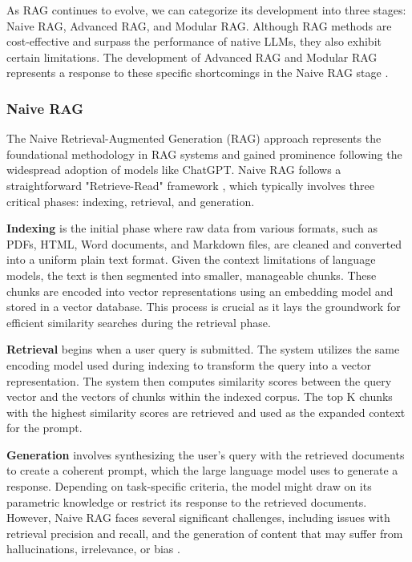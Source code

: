 As RAG continues to evolve, we can categorize its development into three stages: Naive RAG, Advanced RAG, and Modular RAG. Although RAG methods are cost-effective and surpass the performance of native LLMs, they also exhibit certain limitations. The development of Advanced RAG and Modular RAG represents a response to these specific shortcomings in the Naive RAG stage \cite{gao2023retrieval}.

\subsubsection{Naive RAG}

The Naive Retrieval-Augmented Generation (RAG) approach represents the foundational methodology in RAG systems and gained prominence following the widespread adoption of models like ChatGPT. Naive RAG follows a straightforward "Retrieve-Read" framework \cite{ma2023query}, which typically involves three critical phases: indexing, retrieval, and generation.

\textbf{Indexing} is the initial phase where raw data from various formats, such as PDFs, HTML, Word documents, and Markdown files, are cleaned and converted into a uniform plain text format. Given the context limitations of language models, the text is then segmented into smaller, manageable chunks. These chunks are encoded into vector representations using an embedding model and stored in a vector database. This process is crucial as it lays the groundwork for efficient similarity searches during the retrieval phase.

\textbf{Retrieval} begins when a user query is submitted. The system utilizes the same encoding model used during indexing to transform the query into a vector representation. The system then computes similarity scores between the query vector and the vectors of chunks within the indexed corpus. The top K chunks with the highest similarity scores are retrieved and used as the expanded context for the prompt.

\textbf{Generation} involves synthesizing the user’s query with the retrieved documents to create a coherent prompt, which the large language model uses to generate a response. Depending on task-specific criteria, the model might draw on its parametric knowledge or restrict its response to the retrieved documents. However, Naive RAG faces several significant challenges, including issues with retrieval precision and recall, and the generation of content that may suffer from hallucinations, irrelevance, or bias \cite{gao2023retrieval}.

